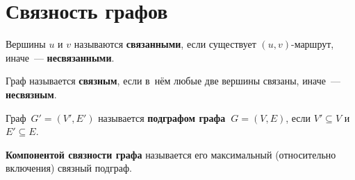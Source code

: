\section{Связность графов}
Вершины $u$ и $v$ называются \textbf{связанными}, если существует $(u, v)$-маршрут, иначе~--- \textbf{несвязанными}.

 Граф называется \textbf{связным}, если в~нём любые две вершины связаны, иначе~--- \textbf{несвязным}.

Граф~$G' = (V', E')$ называется \textbf{подграфом графа~$G = (V, E)$}, если $V' \subseteq V$ и $E' \subseteq E$.

 \textbf{Компонентой связности графа} называется его максимальный (относительно включения) связный подграф.